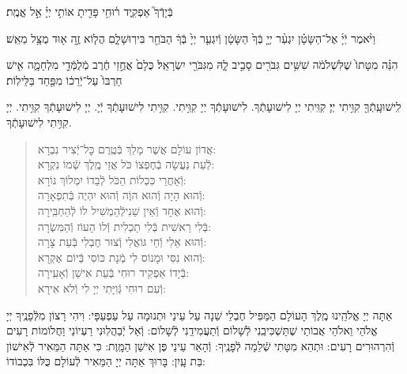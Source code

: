 \documentclass[twoside, openany, parskip=half, 11pt]{book}
\begin{document}
בְּֿיָדְֿךָ֮ אַפְקִ֢יד ר֫וּחִ֥י פָּדִ֖יתָ אוֹתִ֥י יְיָ֗ אֵ֣ל אֱמֶֽת׃

וַיֹּ֨אמֶר יְֿיָ֜ אֶל־הַשָּׂטָ֗ן יִגְעַ֨ר יְיָ֤ בְּֿךָ֙ הַשָּׂטָ֔ן וְֿיִגְעַ֤ר יְיָ֙ בְּֿךָ֔ הַבֹּחֵ֖ר בִּירֽוּשָׁלָ֑םִ הֲל֧וֹא זֶ֦ה א֖וּד מֻצָּ֥ל מֵאֵֽשׁ׃

הִנֵּ֗ה מִטָּתוֹ֙ שֶׁלִּשְׁלֹמֹ֔ה שִׁשִּׁ֥ים גִּבֹּרִ֖ים סָבִ֣יב לָ֑הּ מִגִּבֹּרֵ֖י יִשְׂרָאֵֽל׃ כֻּלָם֙ אֲחֻ֣זֵי חֶ֔רֶב מְֿלֻמְּֿדֵ֖י מִלְחָמָ֑ה אִ֤ישׁ חַרְבּוֹ֙ עַל־יְֿרֵכ֔וֹ מִפַּ֖חַד בַּלֵּילֽוֹת׃


לִֽישׁוּעָֽתְֿךָ֖ קִוִּ֥יתִי יְיָ׃ קִוִּֽיתִי יְיָ לִישׁוּעָתְֿךָ. לִישׁוּעָתְֿךָ יְיָ קִוִּ֥יתִי. קִוִּ֥יתִי לִישׁוּעָתְֿךָ יְֿיָ. יְיָ לִישׁוּעָתְֿךָ קִוִּ֥יתִי. יְיָ קִוִּ֥יתִי לִישׁוּעָתְֿךָ.

\vspace{-\baselineskip}
\begin{quote}

אֲדוֹן עוֹלָם אֲשֶׁר מָלַךְ \hfill בְּֿטֶֽרֶם כׇּל־יְֿצִיר נִבְרָא:\\
לְֿעֵת נַעֲשָׂה בְֿחֶפְצוֹ כֹּל \hfill אֲזַי מֶֽלֶךְ שְֿׁמוֹ נִקְרָא:\\
וְֿאַחֲרֵי כִּכְלוֹת הַכֹּל \hfill לְֿבַדוֹ יִמְלוֹךְ נוֹרָא:\\
וְֿהוּא הָיָה וְֿהוּא הוֶֹה \hfill וְֿהוּא יִהְיֶה בְּֿתִפְאָרָה:\\
וְֿהוּא אֶחָד וְֿאֵין שֵׁנִי\hfill לְֿהַמְשִׁיל לוֹ לְֿהַחְבִּֽירָה:\\
בְּֿלִי רֵאשִׁית בְּֿלִי תַכְלִית \hfill וְֿלוֹ הָעוֹז וְֿהַמִּשְׂרָה:\\
וְֿהוּא אֵלִי וְֿחַי גּוֹאֲלִי \hfill וְֿצוּר חֶבְלִי בְּֿעֵת צָרָה:\\
וְֿהוּא נִסִּי וּמָנוֹס לִי \hfill מְֿנָת כּוֹסִי בְּֿיוֹם אֶקְרָא:\\
בְּֿיָדוֹ אַפְקִיד רוּחִי \hfill בְּֿעֵת אִישַׁן וְֿאָעִֽירָה:\\
וְֿעִם רוּחִי גְּֿוִיָּתִי \hfill יְיָ לִי וְֿלֹא אִירָא:

\end{quote}


אַתָּה יְיָ אֱלֹהֵֽינוּ מֶֽלֶךְ הָעוֹלָם הַמַּפִּיל חֶבְלֵי שֵׁנָה עַל עֵינַי וּתְנוּמָה עַל עַפְעַפָּי: וִיהִי רָצוֹן מִלְּֿפָנֶֽיךָ יְיָ אֱלֹהַי וֵאלֹהֵי אֲבוֹתַי שֶׁתַּשְׁכִּיבֵֽנִי לְֿשָׁלוֹם וְֿתַעֲמִידֵֽנִי לְֿשָׁלוֹם: וְֿאַל יְֿבַהֲלֽוּנִי רַעְיוֹנַי וַחֲלוֹמוֹת רָעִים וְֿהִרְהוּרִים רָעִים: וּתְהֵא מִטָּתִי שְֿׁלֵמָה לְֿפָנֶֽיךָ: וְֿהָאֵר עֵינַי פֶּן אִישַׁן הַמָּֽוֶת: כִּי אַתָּה הַמֵּאִיר לְֿאִישׁוֹן בַּת עָֽיִן: בָּרוּךְ אַתָּה יְיָ הַמֵּאִיר לְֿעוֹלָם כֻּלּוֹ בִּכְבוֹדוֹ:

\vfill
\end{document}
